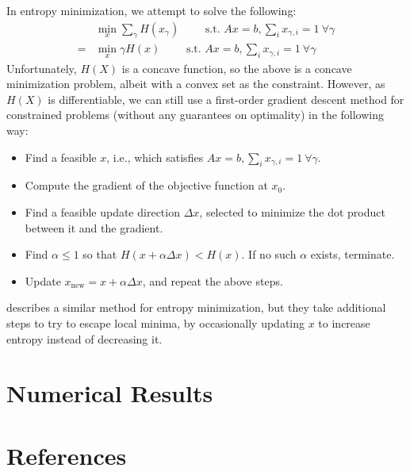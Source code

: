 \documentclass{article} %
\begin{document}
In entropy minimization, we attempt to solve the following:
\begin{align*}
&  \min_{x} \sum_\gamma H(x_\gamma) \qquad \text{ s.t. } Ax = b, \sum_i x_{\gamma, i} = 1\ \forall \gamma \\
=& \min_{x} \gamma H(x) \qquad \text{ s.t. } Ax = b, \sum_i x_{\gamma, i} = 1\ \forall \gamma
\end{align*}
Unfortunately, $H(X)$ is a concave function, so the above is a concave minimization problem, albeit with a convex set as the constraint.
However, as $H(X)$ is differentiable, we can still use a first-order gradient descent method for constrained problems (without any guarantees on optimality) in the following way:
\begin{itemize}
  \item Find a feasible $x$, i.e., which satisfies $Ax = b, \sum_i x_{\gamma, i} = 1\ \forall \gamma$.
  \item Compute the gradient of the objective function at $x_0$.
  \item Find a feasible update direction $\Delta x$, selected to minimize the dot product between it and the gradient.
  \item Find $\alpha \le 1$ so that $H(x + \alpha \Delta x) < H(x)$. If no such $\alpha$ exists, terminate.
  \item Update $x_\textrm{new} = x + \alpha \Delta x$, and repeat the above steps.
\end{itemize}
\cite{sudoku} describes a similar method for entropy minimization, but they take additional steps to try to escape local minima, by occasionally updating $x$ to increase entropy instead of decreasing it.

\section{Numerical Results}
\section{References}

\FloatBarrier
\vskip 0.2in


\end{document}
